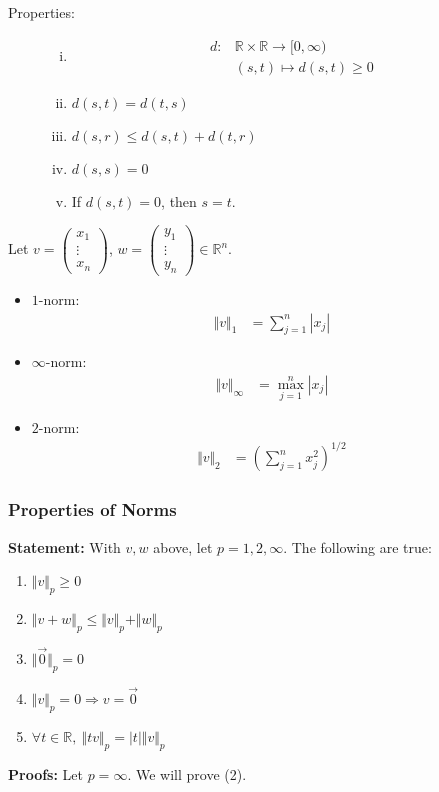 \documentclass[10pt]{extarticle}
\newcommand{\R}{\mathbb{R}}
\begin{document}
    \begin{description}
      \item[Properties:]\hfill
        \begin{enumerate}[(i)]
          \item 
          \begin{align*}
            d: &\R \times \R \rightarrow [0,\infty)\\
               &(s,t) \mapsto d(s,t) \geq 0
          \end{align*}
          \item $d(s,t) = d(t,s)$
          \item $d(s,r) \leq d(s,t) + d(t,r)$
          \item $d(s,s) = 0$
          \item If $d(s,t) = 0$, then $s = t$.
        \end{enumerate}
    \end{description}
    Let $v = \begin{pmatrix}x_1\\\vdots\\x_n\end{pmatrix}$, $ w = \begin{pmatrix}y_1\\\vdots\\y_n\end{pmatrix} \in \R^n$.
    \begin{itemize}
      \item  $1$-norm:
        \begin{align*}
          \Vert v \Vert_1 &= \sum_{j = 1}^{n} |x_j|
        \end{align*}
      \item $\infty$-norm:
        \begin{align*}
          \Vert v \Vert_{\infty} &= \max_{j=1}^{n} |x_j|
        \end{align*}
      \item $2$-norm:
        \begin{align*}
          \Vert v \Vert_2 &= \left(\sum_{j = 1}^{n} x_j^2\right)^{1/2}
        \end{align*}
    \end{itemize}
    \subsubsection{Properties of Norms}%
    \textbf{Statement:} With $v,w$  above, let $p = 1,2,\infty$. The following are true:
        \begin{enumerate}[(1)]
          \item $\Vert v\Vert_p \geq 0$
          \item $\Vert v+w \Vert_p \leq \Vert v\Vert_p + \Vert w \Vert_p$
          \item $\Vert \vec{0}\Vert_p = 0$
          \item $\Vert v\Vert_p = 0 \Rightarrow v = \vec{0}$
          \item $\forall t\in \R,~\Vert tv \Vert_{p} = |t| \Vert v \Vert_p$ 
        \end{enumerate}
    \textbf{Proofs:} Let $p = \infty$. We will prove (2).\\
\end{document}
